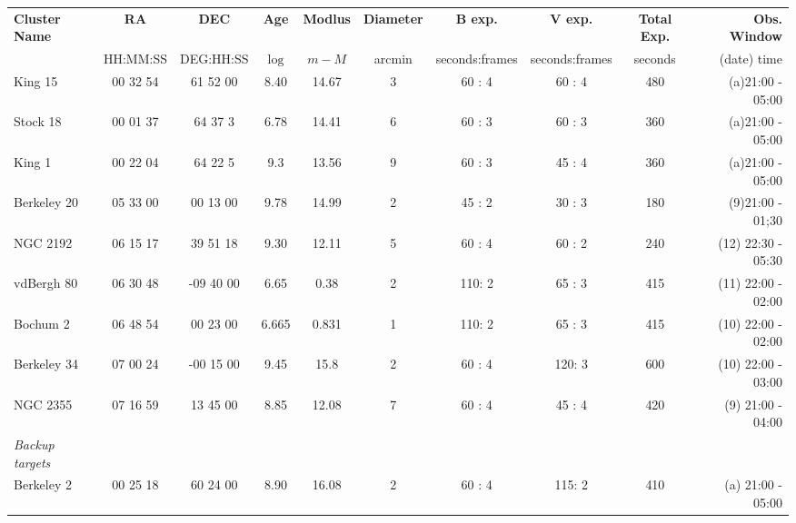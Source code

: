 \begin{landscape}
    \begin{table}[h!]
        \centering
        \begin{tabular}{lccccccccr} \hline \hline
            \textbf{Cluster Name} & \textbf{RA}        & \textbf{DEC}         & \textbf{Age}   & \textbf{Modlus}   & \textbf{Diameter} & \textbf{B exp.} & \textbf{V exp.} & \textbf{Total Exp.} & \textbf{Obs. Window}          \\
            & HH:MM:SS & DEG:HH:SS & $\log$ & $m - M$ & arcmin & seconds:frames & seconds:frames & seconds & (date) time \\ \hline 
            King 15       & 00   32 54 & 61   52 00  & 8.40   & 14.67 & 3    & 60 : 4         & 60 : 4         & 480   & (a)21:00   - 05:00   \\
            Stock 18      & 00   01 37 & 64 37   3   & 6.78  & 14.41 & 6    & 60 : 3         & 60 : 3         & 360   & (a)21:00   - 05:00   \\
            King 1        & 00   22 04 & 64 22   5   & 9.3   & 13.56 & 9    & 60 : 3         & 45 : 4         & 360   & (a)21:00   - 05:00   \\ \hline 
            Berkeley   20 & 05   33 00 & 00   13 00  & 9.78  & 14.99 & 2    & 45 : 2         & 30 : 3         & 180   & (9)21:00   - 01;30   \\
            NGC 2192      & 06   15 17 & 39   51 18  & 9.30   & 12.11 & 5    & 60 : 4        & 60 : 2         & 240   & (12)   22:30 - 05:30 \\
            vdBergh 80    & 06   30 48 & -09   40 00 & 6.65  & 0.38  & 2    & 110: 2         & 65 : 3         & 415   & (11)   22:00 - 02:00 \\ \hline 
            Bochum 2      & 06   48 54 & 00   23 00  & 6.665 & 0.831 & 1 & 110: 2         & 65 : 3         & 415   & (10)   22:00 - 02:00 \\
            Berkeley 34   & 07   00 24 & -00   15 00 & 9.45  & 15.8  & 2    & 60 : 4         & 120: 3         & 600   & (10)   22:00 - 03:00 \\
            NGC 2355      & 07   16 59 & 13   45 00  & 8.85  & 12.08 & 7    & 60 : 4         & 45 : 4         & 420   & (9)   21:00 - 04:00  \\ \hline 
            \textit{Backup targets} & & & & & & & & & \\ \hline 
            Berkeley 2    & 00   25 18 & 60   24 00  & 8.90   & 16.08 & 2    & 60 : 4         & 115: 2         & 410   & (a)   21:00 - 05:00  \\

\end{tabular}
\end{table}
\end{landscape}
